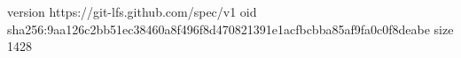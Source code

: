 version https://git-lfs.github.com/spec/v1
oid sha256:9aa126c2bb51ec38460a8f496f8d470821391e1acfbcbba85af9fa0c0f8deabe
size 1428
